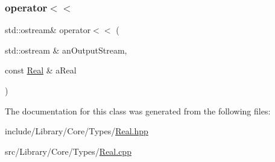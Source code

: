 \mbox{\label{classlibrary_1_1core_1_1types_1_1_real_a36816b0e006fd2ec3b0c53406439c7c3}} 
\subsubsection{\texorpdfstring{operator$<$$<$}{operator<<}}
{\footnotesize\ttfamily std\+::ostream\& operator$<$$<$ (\begin{DoxyParamCaption}\item[{std\+::ostream \&}]{an\+Output\+Stream,  }\item[{const \hyperlink{classlibrary_1_1core_1_1types_1_1_real}{Real} \&}]{a\+Real }\end{DoxyParamCaption})\hspace{0.3cm}{\ttfamily [friend]}}



The documentation for this class was generated from the following files\+:\begin{DoxyCompactItemize}
\item 
include/\+Library/\+Core/\+Types/\hyperlink{_real_8hpp}{Real.\+hpp}\item 
src/\+Library/\+Core/\+Types/\hyperlink{_real_8cpp}{Real.\+cpp}\end{DoxyCompactItemize}
